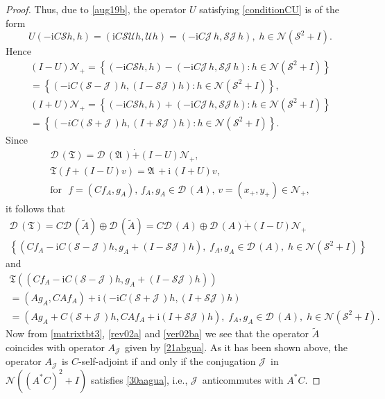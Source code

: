 \documentclass[12pt]{amsart}
\newcommand{\ii}{\mathrm{i}}
\theoremstyle{definition}
\newcommand{\cJ}{\mathcal{J}\,}
\newcommand{\gA}{\mathfrak{A}\,}
\newcommand{\cD}{\mathcal{D}\,}
\newcommand{\cN}{\mathcal{N}}
\newcommand{\cS}{\mathcal{S}}
\newcommand{\cU}{\mathcal{U}}
\newcommand{\gT}{\mathfrak{T}}
\begin{document}
\begin{proof}
Thus, due to \eqref{aug19b}, the operator $U$ satisfying \eqref{conditionCU} is of the form
\[
U(-\ii C\cS h, h)=(\ii C\cS \cU h, \cU h)=(-\ii C\cJ h, \cS \cJ h),\; h\in\cN(\cS^2+I).
\]
Hence
\[
\begin{array}{l}
(I-U)\cN_+=\left\{\left(-\ii C\cS h, h\right)-\left(-\ii C\cJ h, \cS \cJ h\right): h\in\cN(\cS^2+I)\right\}\\[2mm]
=\left\{\left(-\ii C(\cS-\cJ)h,(I-\cS \cJ) h\right): h\in\cN(\cS^2+I)\right\},\\[2mm]
(I+U)\cN_+=\left\{\left(-\ii C\cS h, h\right)+\left(-\ii C\cJ h, \cS \cJ h\right): h\in\cN(\cS^2+I)\right\}\\[2mm]
=\left\{\left(-iC(\cS+\cJ)h,(I+\cS \cJ) h\right): h\in\cN(\cS^2+I)\right\}.
\end{array}
\]
Since
\[
\begin{array}{l}
\cD(\gT)         =\cD(\gA)\dot{+} (I-U)\cN_+,\\[2mm]
\gT(f+(I-U)v) =\gA+\ii \, (I+U)v,\\[2mm]
\textrm{for}~~~ f=(Cf_A,g_A),\,  f_A,g_A\in \cD(A), \,v=(x_+,y_+)\in \cN_+,
\end{array}
\]%
it follows that
\begin{equation}\label{rev02a}
\begin{array}{l}
\cD(\gT)=C\cD(\widetilde A)\oplus\cD(\widetilde A)%
=C\cD(A)\oplus\cD(A)\dot+(I-U)\cN_+\\[2mm]
\left\{(Cf_A-\ii C(\cS-\cJ)h,g_A+(I-\cS \cJ) h),\; %
f_A,g_A\in\cD(A),\;h\in\cN(\cS^2+I)\right\}
\end{array}
\end{equation}
and
\begin{equation}\label{ver02ba}
\begin{array}{l}
\gT\left((Cf_A-\ii C(\cS-\cJ)h,g_A+(I-\cS \cJ) h)\right)\\
=\left(Ag_A,CAf_A\right)
+\ii\left(-\ii C(\cS+\cJ)h,(I+\cS \cJ) h\right)\\[2mm]
=\left(Ag_A+C(\cS+\cJ)h, CAf_A+\ii(I+\cS \cJ) h\right),\;%
 f_A,g_A\in\cD(A),\;h\in\cN(\cS^2+I).
\end{array}
\end{equation}
Now from \eqref{matrixtbt3}, \eqref{rev02a} and \eqref{ver02ba} we see that the operator $\widetilde A$ coincides with operator $A_{\cJ}$ given by \eqref{21abgua}.
As it has been shown above, the operator $A_{\cJ}$ is $C$-self-adjoint if and only if the conjugation $\cJ$ in $\cN((A^*C)^2+I)$ satisfies \eqref{30aagua}, i.e., $\cJ$ anticommutes with $A^*C$.
\end{proof}
\end{document}
